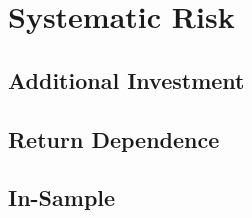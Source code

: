 \documentclass[mnsc,blindrev]{informs3} %
\begin{document}


\section{Systematic Risk}\label{sec:regression}


\subsection{Additional Investment} \label{sec:reinvestment}
%
%



\subsection{Return Dependence} \label{sec:market_cap}


\subsection{In-Sample} \label{sec:in_sample}







%
%
%
%
%
%
%
\end{document}
